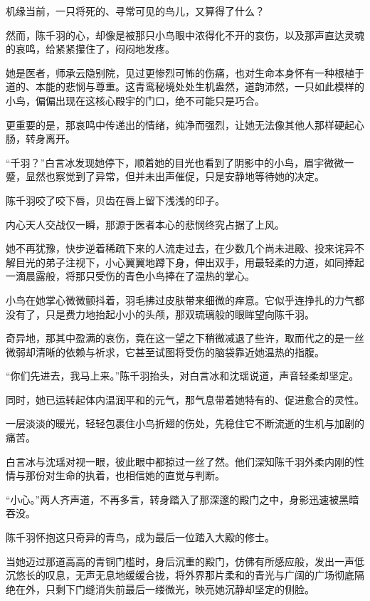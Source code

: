 机缘当前，一只将死的、寻常可见的鸟儿，又算得了什么？

然而，陈千羽的心，却像是被那只小鸟眼中浓得化不开的哀伤，以及那声直达灵魂的哀鸣，给紧紧攥住了，闷闷地发疼。

她是医者，师承云隐别院，见过更惨烈可怖的伤痛，也对生命本身怀有一种根植于道的、本能的悲悯与尊重。这青鸾秘境处处生机盎然，道韵沛然，一只如此模样的小鸟，偏偏出现在这核心殿宇的门口，绝不可能只是巧合。

更重要的是，那哀鸣中传递出的情绪，纯净而强烈，让她无法像其他人那样硬起心肠，转身离开。

“千羽？”白言冰发现她停下，顺着她的目光也看到了阴影中的小鸟，眉宇微微一蹙，显然也察觉到了异常，但并未出声催促，只是安静地等待她的决定。

陈千羽咬了咬下唇，贝齿在唇上留下浅浅的印子。

内心天人交战仅一瞬，那源于医者本心的悲悯终究占据了上风。

她不再犹豫，快步逆着稀疏下来的人流走过去，在少数几个尚未进殿、投来诧异不解目光的弟子注视下，小心翼翼地蹲下身，伸出双手，用最轻柔的力道，如同捧起一滴晨露般，将那只受伤的青色小鸟捧在了温热的掌心。

小鸟在她掌心微微颤抖着，羽毛拂过皮肤带来细微的痒意。它似乎连挣扎的力气都没有了，只是费力地抬起小小的头颅，那双琉璃般的眼眸望向陈千羽。

奇异地，那其中盈满的哀伤，竟在这一望之下稍微减退了些许，取而代之的是一丝微弱却清晰的依赖与祈求，它甚至试图将受伤的脑袋靠近她温热的指腹。

“你们先进去，我马上来。”陈千羽抬头，对白言冰和沈瑶说道，声音轻柔却坚定。

同时，她已运转起体内温润平和的元气，那气息带着她特有的、促进愈合的灵性。

一层淡淡的暖光，轻轻包裹住小鸟折翅的伤处，先稳住它不断流逝的生机与加剧的痛苦。

白言冰与沈瑶对视一眼，彼此眼中都掠过一丝了然。他们深知陈千羽外柔内刚的性情与那份对生命的执着，也相信她的直觉与判断。

“小心。”两人齐声道，不再多言，转身踏入了那深邃的殿门之中，身影迅速被黑暗吞没。

陈千羽怀抱这只奇异的青鸟，成为最后一位踏入大殿的修士。

当她迈过那道高高的青铜门槛时，身后沉重的殿门，仿佛有所感应般，发出一声低沉悠长的叹息，无声无息地缓缓合拢，将外界那片柔和的青光与广阔的广场彻底隔绝在外，只剩下门缝消失前最后一缕微光，映亮她沉静却坚定的侧脸。

\vspace{2em}


